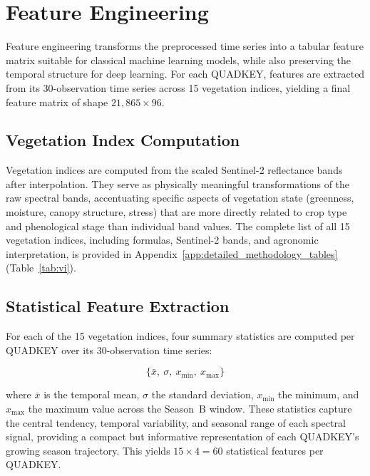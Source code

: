\section{Feature Engineering}
\label{sec:features}

Feature engineering transforms the preprocessed time series into a
tabular feature matrix suitable for classical machine learning models,
while also preserving the temporal structure for deep learning. For each
QUADKEY, features are extracted from its 30-observation time series across
15 vegetation indices, yielding a final feature matrix of shape
$21{,}865 \times 96$.


\subsection{Vegetation Index Computation}
\label{subsec:vi}

Vegetation indices are computed from the scaled Sentinel-2 reflectance
bands after interpolation. They serve as physically meaningful
transformations of the raw spectral bands, accentuating specific aspects
of vegetation state (greenness, moisture, canopy structure, stress)
that are more directly related to crop type and phenological stage than
individual band values. The complete list of all 15 vegetation indices,
including formulas, Sentinel-2 bands, and agronomic interpretation, is
provided in Appendix~\ref{app:detailed_methodology_tables}
(Table~\ref{tab:vi}).


\subsection{Statistical Feature Extraction}
\label{subsec:stat_features}

For each of the 15 vegetation indices, four summary statistics are
computed per QUADKEY over its 30-observation time series:

\begin{equation}
\label{eq:stat_features}
\{\bar{x},\ \sigma,\ x_{\min},\ x_{\max}\}
\end{equation}

where $\bar{x}$ is the temporal mean, $\sigma$ the standard deviation,
$x_{\min}$ the minimum, and $x_{\max}$ the maximum value across the
Season~B window. These statistics capture the central tendency, temporal
variability, and seasonal range of each spectral signal, providing a
compact but informative representation of each QUADKEY's growing season
trajectory. This yields $15 \times 4 = 60$ statistical features per
QUADKEY.


